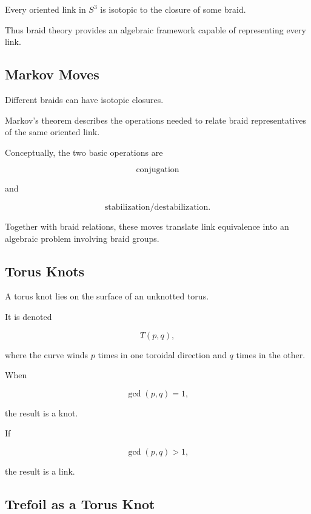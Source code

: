 \begin{theorem}
Every oriented link in \(S^3\) is isotopic to the closure of some braid.
\end{theorem}

Thus braid theory provides an algebraic framework capable of representing
every link.

\subsection{Markov Moves}
\label{subsec:markov-moves}

Different braids can have isotopic closures.

Markov's theorem describes the operations needed to relate braid
representatives of the same oriented link.

Conceptually, the two basic operations are

\[
\boxed{
\text{conjugation}
}
\]

and

\[
\boxed{
\text{stabilization/destabilization}.
}
\]

Together with braid relations, these moves translate link equivalence into
an algebraic problem involving braid groups.

\subsection{Torus Knots}
\label{subsec:torus-knots}

A torus knot lies on the surface of an unknotted torus.

It is denoted

\[
\boxed{
T(p,q),
}
\]

where the curve winds \(p\) times in one toroidal direction and \(q\) times
in the other.

When

\[
\gcd(p,q)=1,
\]

the result is a knot.

If

\[
\gcd(p,q)>1,
\]

the result is a link.

\subsection{Trefoil as a Torus Knot}
\label{subsec:trefoil-torus-knot}

